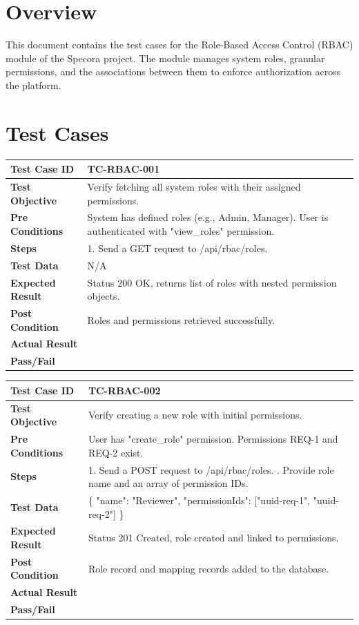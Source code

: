 \section{Overview}
This document contains the test cases for the Role-Based Access Control (RBAC) module of the Specora project. The module manages system roles, granular permissions, and the associations between them to enforce authorization across the platform.

\section{Test Cases}

\begin{longtable}{|p{}|p{}|}
\hline
\textbf{Test Case ID} & TC-RBAC-001 \\ \hline
\textbf{Test Objective} & Verify fetching all system roles with their assigned permissions. \\ \hline
\textbf{Pre Conditions} & System has defined roles (e.g., Admin, Manager). User is authenticated with "view_roles" permission. \\ \hline
\textbf{Steps} & 
1. Send a GET request to /api/rbac/roles. \\ \hline
\textbf{Test Data} & N/A \\ \hline
\textbf{Expected Result} & Status 200 OK, returns list of roles with nested permission objects. \\ \hline
\textbf{Post Condition} & Roles and permissions retrieved successfully. \\ \hline
\textbf{Actual Result} &  \\ \hline
\textbf{Pass/Fail} &  \\ \hline
\end{longtable}

\begin{longtable}{|p{}|p{}|}
\hline
\textbf{Test Case ID} & TC-RBAC-002 \\ \hline
\textbf{Test Objective} & Verify creating a new role with initial permissions. \\ \hline
\textbf{Pre Conditions} & User has "create_role" permission. Permissions REQ-1 and REQ-2 exist. \\ \hline
\textbf{Steps} & 
1. Send a POST request to /api/rbac/roles. \newline
2. Provide role name and an array of permission IDs. \\ \hline
\textbf{Test Data} & \{ "name": "Reviewer", "permissionIds": ["uuid-req-1", "uuid-req-2"] \} \\ \hline
\textbf{Expected Result} & Status 201 Created, role created and linked to permissions. \\ \hline
\textbf{Post Condition} & Role record and mapping records added to the database. \\ \hline
\textbf{Actual Result} &  \\ \hline
\textbf{Pass/Fail} &  \\ \hline
\end{longtable}

